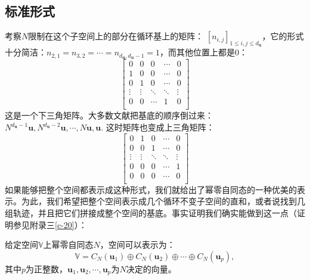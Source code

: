 \documentclass[12pt,UTF8]{ctexbook}
\begin{document}
\subsection{标准形式}
考察$N$限制在这个子空间上的部分在循环基上的矩阵：
$[n_{i,j}]_{1 \leqslant i, j \leqslant d_\mathbf{u}}$，它的形式十分简洁：$n_{2,1} = n_{3,2} = \cdots = n_{d_\mathbf{u}, d_\mathbf{u}-1} = 1$，而其他位置上都是0：
$$ \begin{bmatrix}
     0 & 0 & 0 & \cdots & 0 \\
     1 & 0 & 0 & \cdots & 0 \\
     0 & 1 & 0 & \cdots & 0  \\
     \vdots & \vdots & \ddots & \ddots & \vdots  \\
     0 & 0 & \cdots & 1 & 0 \\
    \end{bmatrix} $$
这是一个下三角矩阵。大多数文献把基底的顺序倒过来：$N^{d_\mathbf{u} - 1} \mathbf{u}, N^{d_\mathbf{u} - 2}\mathbf{u}, \cdots , N \mathbf{u}, \mathbf{u}$. 这时矩阵也变成上三角矩阵：
$$ \begin{bmatrix}
     0 & 1 & 0 & \cdots & 0 \\
     0 & 0 & 1 & \cdots & 0 \\
     \vdots & \vdots & \ddots & \ddots & \vdots  \\
     0 & 0 & 0 & \cdots & 1  \\
     0 & 0 & 0 & \cdots & 0 \\
    \end{bmatrix} $$
如果能够把整个空间都表示成这种形式，我们就给出了幂零自同态的一种优美的表示。为此，我们希望把整个空间表示成几个循环不变子空间的直和，或者说找到几组轨迹，并且把它们拼接成整个空间的基底。事实证明我们确实能做到这一点（证明参见附录三\ref{c-20}）：
\begin{pp}\label{pp:6_12_4}
    给定空间$\mathbb{V}$上幂零自同态$N$，空间可以表示为：
    $$ \mathbb{V} = C_N(\mathbf{u}_1) \oplus C_N(\mathbf{u}_2) \oplus \cdots \oplus C_N(\mathbf{u}_p),$$
    其中$p$为正整数，$\mathbf{u}_1, \mathbf{u}_2, \cdots , \mathbf{u}_p$为$N$决定的向量。
\end{pp}
\end{document}

